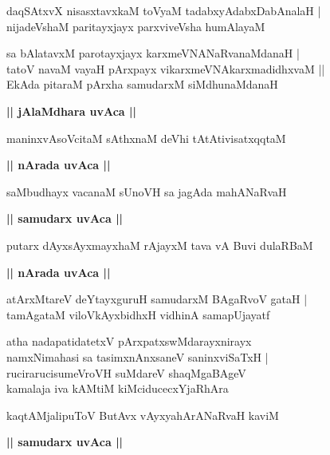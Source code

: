 \documentclass[twoside,12pt,openright]{book}
\newcounter{shloka}[chapter]
\def\uvaca#1{\centerline{{\large\textbf{#1}}}}
\begin{document}
\begin{shloka}%
daqSAtxvX nisasxtavxkaM toVyaM tadabxyAdabxDabAnalaH |\\
nijadeVshaM paritayxjayx parxviveVsha humAlayaM 
\end{shloka}

\begin{shloka}%
sa bAlatavxM parotayxjayx karxmeVNANaRvanaMdanaH |\\
tatoV navaM vayaH pArxpayx vikarxmeVNAkarxmadidhxvaM ||\\
EkAda pitaraM pArxha samudarxM siMdhunaMdanaH 
\end{shloka}

\uvaca{|| jAlaMdhara uvAca ||}

\begin{shloka}%
maninxvAsoVcitaM sAthxnaM deVhi tAtAtivisatxqqtaM 
\end{shloka}

\uvaca{|| nArada uvAca ||}

\begin{shloka}%
saMbudhayx vacanaM sUnoVH sa jagAda mahANaRvaH 
\end{shloka}

\uvaca{|| samudarx uvAca ||}

\begin{shloka}%
putarx dAyxsAyxmayxhaM rAjayxM tava vA Buvi dulaRBaM 
\end{shloka}


\uvaca{|| nArada uvAca ||}

\begin{shloka}%
atArxMtareV deYtayxguruH samudarxM BAgaRvoV gataH |\\
tamAgataM viloVkAyxbidhxH vidhinA samapUjayatf 
\end{shloka}

\begin{shloka}%
atha nadapatidatetxV pArxpatxswMdarayxnirayx \\
namxNimahasi sa tasimxnAnxsaneV saninxviSaTxH |\\
rucirarucisumeVroVH suMdareV shaqMgaBAgeV \\
kamalaja iva kAMtiM kiMciducecxYjaRhAra
\end{shloka}

\begin{shloka}%
kaqtAMjalipuToV ButAvx vAyxyahArANaRvaH kaviM \\
\end{shloka}

\uvaca{|| samudarx uvAca ||}
\end{document}
